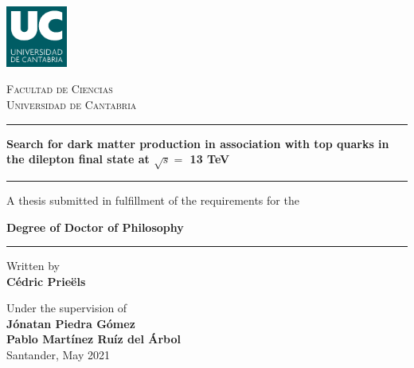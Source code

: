 \documentclass[a4paper, 10pt, openright]{report}
\begin{document}
\renewcommand{\listfigurename}{List of figures} 
\renewcommand{\listtablename}{List of tables}
\renewcommand{\floatpagefraction}{.95}%


\setlength{\parfillskip}{0pt plus\dimexpr\textwidth-2\parindent}

\doublespacing
{}\baselineskip
\setlength{\parindent}{0pt}	

\renewcommand{\arraystretch}{1.5}

\begin{titlepage}

	\centering
	\includegraphics[width=0.15\textwidth]{figs/image_UC.png}\par
	{\scshape\LARGE Facultad de Ciencias \\ \vspace{-15pt} Universidad de Cantabria \par}
	
	\vspace{0.8cm}
	
	\noindent\rule{15cm}{0.4pt}\par 
	{\huge\bfseries Search for dark matter production in association with top quarks in the dilepton final state at $\sqrt{s} = $ 13 TeV\par \vspace{10pt}}
	\noindent\rule{15cm}{0.4pt}\par 
	
	{\vspace{20pt} \Large A thesis submitted in fulfillment of the requirements for the \par \LARGE \textbf{Degree of Doctor of Philosophy} \vspace{20pt} \par \noindent\rule{15cm}{0.4pt}}
	
	\vspace{0.8cm}
	{\Large Written by \\ \textbf{C\'{e}dric Prie\"{e}ls}\par}
	\vspace{0.5cm}
	{\Large Under the supervision of \\ \textbf{J\'{o}natan Piedra G\'{o}mez} \\
	\vspace{-10pt}
	\textbf{Pablo Mart\'{i}nez Ru\'{i}z del \'{A}rbol}\\}
	\vspace{2.6cm}
	{\Large Santander, May 2021}
	\vfill

\end{titlepage}
\end{document}
